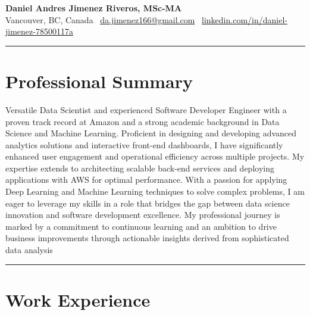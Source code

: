 \documentclass[10pt,a4paper]{article}
\begin{document}
\titlespacing*{\section}{0pt}{0pt}{10pt} 
\titlespacing*{\subsection}{0pt}{10pt}{5pt} 
\titlespacing*{\section}{0pt}{0pt}{4pt}


\pagestyle{empty}

{
\centering
{\Huge\textbf{Daniel Andres Jimenez Riveros, MSc-MA}}\\
\medskip 
Vancouver, BC, Canada \textbar\ \href{mailto:da.jimenez166@gmail.com}{da.jimenez166@gmail.com} \textbar\ \href{https://www.linkedin.com/in/daniel-jimenez-78500117a/}{linkedin.com/in/daniel-jimenez-78500117a}\\
}

\rule{\textwidth}{0.4pt} 

\section*{Professional Summary}
Versatile Data Scientist and experienced Software Developer Engineer with a proven track record at Amazon and a strong academic background in Data Science and Machine Learning. Proficient in designing and developing advanced analytics solutions and interactive front-end dashboards, I have significantly enhanced user engagement and operational efficiency across multiple projects. My expertise extends to architecting scalable back-end services and deploying applications with AWS for optimal performance. With a passion for applying Deep Learning and Machine Learning techniques to solve complex problems, I am eager to leverage my skills in a role that bridges the gap between data science innovation and software development excellence. My professional journey is marked by a commitment to continuous learning and an ambition to drive business improvements through actionable insights derived from sophisticated data analysis
\rule{\textwidth}{0.4pt} 

\section*{Work Experience}
\end{document}
